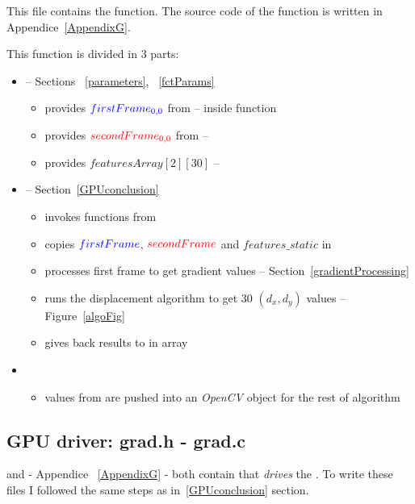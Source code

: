 This file contains the  function. The source code of the function is written in Appendice~\ref{AppendixG}.

This function is divided in 3 parts:
\begin{itemize}
	\item {} -- Sections ~\ref{parameters}, ~\ref{fctParams}
		\begin{itemize}
			\item provides $\textcolor{blue}{firstFrame_{0,0}}$ from  --  inside function
			\item provides $\textcolor{red}{secondFrame_{0,0}}$  from  -- 
			\item provides  $featuresArray[2][30]$ -- 
		\end{itemize}
	\item {} -- Section~\ref{GPUconclusion}
		\begin{itemize}
			\item invokes functions from 
			\item copies $\textcolor{blue}{firstFrame}$, $\textcolor{red}{secondFrame}$ and $features\_static$ in \ram
			\item processes first frame to get gradient values -- Section~\ref{gradientProcessing}
			\item runs the displacement algorithm to get 30 $(d_{x}, d_{y})$ values -- Figure~\ref{algoFig}
			\item gives back results to \cpu{} in  array
		\end{itemize}
	\item {}
		\begin{itemize}
			\item values from  are pushed into an \emph{OpenCV} object for the rest of  algorithm
		\end{itemize}
\end{itemize}

\subsection{GPU driver: grad.h - grad.c}

 and  - Appendice ~\ref{AppendixG} - both contain  that \emph{drives} the \vc. To write these files I followed the same steps as in~\ref{GPUconclusion} section.


